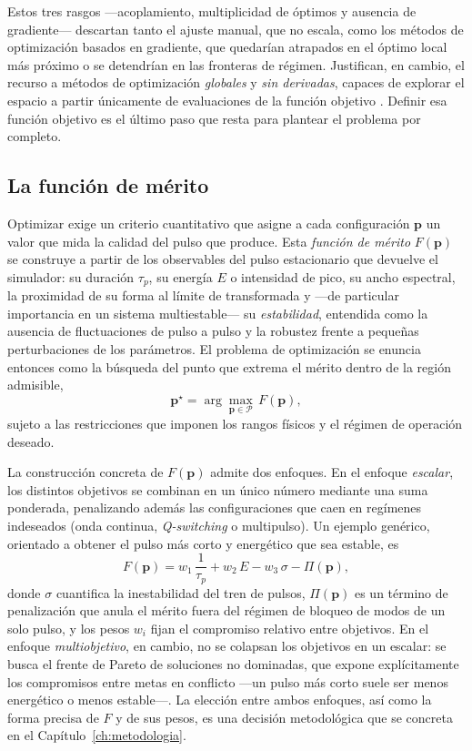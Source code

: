 Estos tres rasgos —acoplamiento, multiplicidad de óptimos y ausencia de
gradiente— descartan tanto el ajuste manual, que no escala, como los métodos de
optimización basados en gradiente, que quedarían atrapados en el óptimo local más
próximo o se detendrían en las fronteras de régimen. Justifican, en cambio, el
recurso a métodos de optimización \emph{globales} y \emph{sin derivadas}, capaces
de explorar el espacio a partir únicamente de evaluaciones de la función objetivo
\cite{Genty2021,BruntonKutz2022}. Definir esa función objetivo es el último paso
que resta para plantear el problema por completo.

\subsection{La función de mérito}
\label{sec:funcion_merito}

Optimizar exige un criterio cuantitativo que asigne a cada configuración
$\mathbf{p}$ un valor que mida la calidad del pulso que produce. Esta \emph{función
de mérito} $F(\mathbf{p})$ se construye a partir de los observables del pulso
estacionario que devuelve el simulador: su duración $\tau_p$, su energía $E$ o
intensidad de pico, su ancho espectral, la proximidad de su forma al límite de
transformada y —de particular importancia en un sistema multiestable— su
\emph{estabilidad}, entendida como la ausencia de fluctuaciones de pulso a pulso y
la robustez frente a pequeñas perturbaciones de los parámetros. El problema de
optimización se enuncia entonces como la búsqueda del punto que extrema el mérito
dentro de la región admisible,
%
\begin{equation}
    \mathbf{p}^{\star} = \arg\max_{\mathbf{p}\in\mathcal{P}}\, F(\mathbf{p}),
    \label{eq:problema_optimizacion}
\end{equation}
%
sujeto a las restricciones que imponen los rangos físicos y el régimen de operación
deseado.

La construcción concreta de $F(\mathbf{p})$ admite dos enfoques. En el enfoque
\emph{escalar}, los distintos objetivos se combinan en un único número mediante una
suma ponderada, penalizando además las configuraciones que caen en regímenes
indeseados (onda continua, \emph{Q-switching} o multipulso). Un ejemplo genérico,
orientado a obtener el pulso más corto y energético que sea estable, es
%
\begin{equation}
    F(\mathbf{p}) = w_1\,\frac{1}{\tau_p}
    + w_2\,E - w_3\,\sigma
    - \Pi(\mathbf{p}),
    \label{eq:merito_escalar}
\end{equation}
%
donde $\sigma$ cuantifica la inestabilidad del tren de pulsos, $\Pi(\mathbf{p})$ es
un término de penalización que anula el mérito fuera del régimen de bloqueo de
modos de un solo pulso, y los pesos $w_i$ fijan el compromiso relativo entre
objetivos. En el enfoque \emph{multiobjetivo}, en cambio, no se colapsan los
objetivos en un escalar: se busca el frente de Pareto de soluciones no dominadas,
que expone explícitamente los compromisos entre metas en conflicto —un pulso más
corto suele ser menos energético o menos estable—. La elección entre ambos
enfoques, así como la forma precisa de $F$ y de sus pesos, es una decisión
metodológica que se concreta en el Capítulo~\ref{ch:metodologia}.

